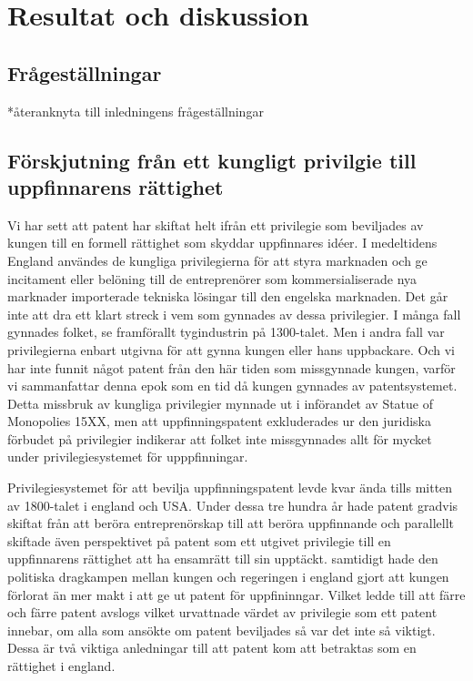 \section{Resultat och diskussion}
\label{sec:disk}



\subsection{Frågeställningar}
*återanknyta till inledningens frågeställningar



\subsection{Förskjutning från ett kungligt privilgie till uppfinnarens rättighet}
Vi har sett att patent har skiftat helt ifrån ett privilegie som beviljades av kungen till en formell rättighet som skyddar uppfinnares idéer. I medeltidens England användes de kungliga privilegierna för att styra marknaden och ge incitament eller belöning till de entreprenörer som kommersialiserade nya marknader importerade tekniska lösingar till den engelska marknaden. Det går inte att dra ett klart streck i vem som gynnades av dessa privilegier. I många fall gynnades folket, se framförallt tygindustrin på 1300-talet. Men i andra fall var privilegierna enbart utgivna för att gynna kungen eller hans uppbackare.%
Och vi har inte funnit något patent från den här tiden som missgynnade kungen, varför vi sammanfattar denna epok som en tid då kungen gynnades av patentsystemet. Detta missbruk av kungliga privilegier mynnade ut i införandet av Statue of Monopolies 15XX, men att uppfinningspatent exkluderades ur den juridiska förbudet på privilegier indikerar att folket inte missgynnades allt för mycket under privilegiesystemet för upppfinningar.

Privilegiesystemet för att bevilja uppfinningspatent levde kvar ända tills mitten av 1800-talet i england och USA. Under dessa tre hundra år hade patent gradvis skiftat från att beröra entreprenörskap till att beröra uppfinnande och parallellt skiftade även perspektivet på patent som ett utgivet privilegie till en uppfinnarens rättighet att ha ensamrätt till sin upptäckt. samtidigt hade den politiska dragkampen mellan kungen och regeringen i england gjort att kungen förlorat än mer makt i att ge ut patent för uppfininngar. Vilket ledde till att färre och färre patent avslogs vilket urvattnade värdet av privilegie som ett patent innebar, om alla som ansökte om patent beviljades så var det inte så viktigt. Dessa är två viktiga anledningar till att patent kom att betraktas som en rättighet i england.

